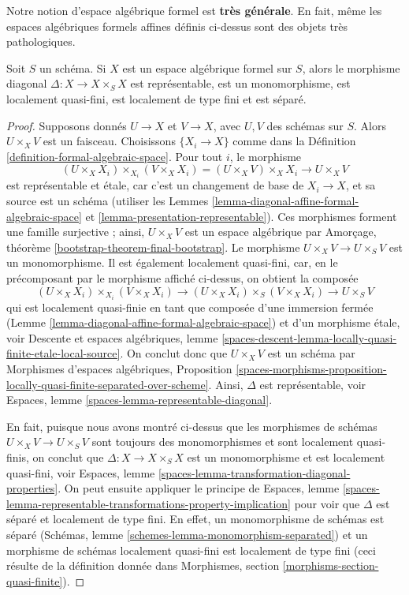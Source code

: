 \medskip\noindent
Notre notion d'espace algébrique formel est {\bf très générale}.
En fait, même les espaces algébriques formels affines définis ci-dessus
sont des objets très pathologiques.

\begin{lemma}
\label{lemma-diagonal-formal-algebraic-space}
Soit $S$ un schéma. Si $X$ est un espace algébrique formel sur
$S$, alors le morphisme diagonal $\Delta : X \to X \times_S X$
est représentable, est un monomorphisme, est localement quasi-fini,
est localement de type fini et est séparé.
\end{lemma}

\begin{proof}
Supposons donnés $U \to X$ et $V \to X$, avec $U, V$ des schémas sur $S$.
Alors $U \times_X V$ est un faisceau. Choisissons $\{X_i \to X\}$ comme dans la
Définition \ref{definition-formal-algebraic-space}.
Pour tout $i$, le morphisme
$$
(U \times_X X_i) \times_{X_i} (V \times_X X_i)
= (U \times_X V) \times_X X_i \to U \times_X V
$$
est représentable et étale, car c'est un changement de base de $X_i \to X$,
et sa source est un schéma (utiliser les
Lemmes \ref{lemma-diagonal-affine-formal-algebraic-space} et
\ref{lemma-presentation-representable}). Ces morphismes forment une famille surjective ;
ainsi, $U \times_X V$ est un espace algébrique par
Amorçage, théorème \ref{bootstrap-theorem-final-bootstrap}.
Le morphisme $U \times_X V \to U \times_S V$ est un monomorphisme.
Il est également localement quasi-fini, car, en le précomposant par
le morphisme affiché ci-dessus, on obtient la composée
$$
(U \times_X X_i) \times_{X_i} (V \times_X X_i)
\to (U \times_X X_i) \times_S (V \times_X X_i)
\to U \times_S V
$$
qui est localement quasi-finie en tant que composée d'une immersion
fermée (Lemme \ref{lemma-diagonal-affine-formal-algebraic-space})
et d'un morphisme étale, voir
Descente et espaces algébriques, lemme
\ref{spaces-descent-lemma-locally-quasi-finite-etale-local-source}.
On conclut donc que $U \times_X V$ est un schéma par
Morphismes d'espaces algébriques, Proposition
\ref{spaces-morphisms-proposition-locally-quasi-finite-separated-over-scheme}.
Ainsi, $\Delta$ est représentable, voir
Espaces, lemme \ref{spaces-lemma-representable-diagonal}.

\medskip\noindent
En fait, puisque nous avons montré ci-dessus que les morphismes de schémas
$U \times_X V \to U \times_S V$ sont toujours des monomorphismes et sont
localement quasi-finis, on conclut que $\Delta : X \to X \times_S X$
est un monomorphisme et est localement quasi-fini, voir
Espaces, lemme \ref{spaces-lemma-transformation-diagonal-properties}.
On peut ensuite appliquer le principe de
Espaces, lemme
\ref{spaces-lemma-representable-transformations-property-implication}
pour voir que $\Delta$ est séparé et localement de type fini.
En effet, un monomorphisme de schémas est séparé
(Schémas, lemme \ref{schemes-lemma-monomorphism-separated})
et un morphisme de schémas localement quasi-fini est
localement de type fini
(ceci résulte de la définition donnée dans
Morphismes, section \ref{morphisms-section-quasi-finite}).
\end{proof}


